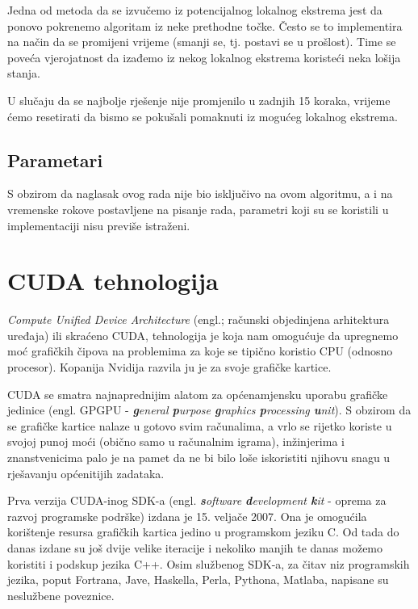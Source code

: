 \documentclass[times, utf8, zavrsni]{fer}
\begin{document}
Jedna od metoda da se izvučemo iz potencijalnog lokalnog ekstrema jest da
ponovo pokrenemo algoritam iz neke prethodne točke. Često se to implementira
na način da se promijeni vrijeme (smanji se, tj. postavi se u prošlost).
Time se poveća vjerojatnost da izađemo iz nekog lokalnog ekstrema koristeći
neka lošija stanja. 

U slučaju da se najbolje rješenje nije promjenilo u zadnjih 15 koraka, 
vrijeme ćemo resetirati da bismo se pokušali pomaknuti iz mogućeg lokalnog
ekstrema. 

\section{Parametari}

S obzirom da naglasak ovog rada nije bio isključivo na ovom algoritmu, 
a i na vremenske rokove postavljene na pisanje rada, parametri koji su se
koristili u implementaciji nisu previše istraženi. 






\chapter{CUDA tehnologija}
\textit{Compute Unified Device Architecture} (engl.; računski objedinjena
arhitektura uređaja) ili skraćeno CUDA, tehnologija je
koja nam omogućuje da upregnemo moć grafičkih čipova na
problemima za koje se tipično koristio CPU (odnosno procesor).
Kopanija Nvidija razvila ju je za svoje grafičke kartice. 

CUDA se smatra najnaprednijim alatom za općenamjensku uporabu
grafičke jedinice (engl. GPGPU - \textit{\textbf{g}eneral
\textbf{p}urpose \textbf{g}raphics \textbf{p}rocessing \textbf{u}nit}).
S obzirom da se grafičke kartice nalaze u gotovo svim
računalima, a vrlo se rijetko koriste u svojoj punoj moći
(obično samo u računalnim igrama), inžinjerima i znanstvenicima
palo je na pamet da ne bi bilo loše iskoristiti njihovu snagu
u rješavanju općenitijih zadataka. 

Prva verzija CUDA-inog SDK-a (engl. \textit{\textbf{s}oftware
\textbf{d}evelopment \textbf{k}it} - oprema za razvoj programske
podrške) izdana je 15. veljače 2007.
Ona je omogućila korištenje resursa grafičkih kartica jedino u
programskom jeziku C. Od tada do danas izdane su još dvije velike
iteracije i nekoliko manjih te danas možemo koristiti i podskup
jezika C++. Osim službenog SDK-a, za čitav niz programskih jezika,
poput Fortrana, Jave, Haskella, Perla, Pythona, Matlaba, napisane su
neslužbene poveznice. 
\end{document}
